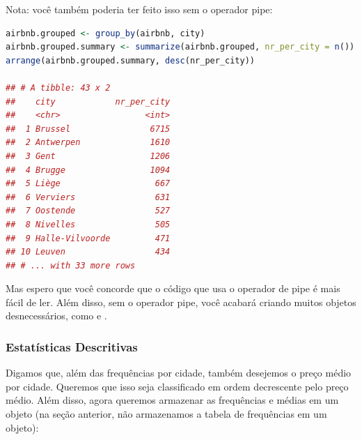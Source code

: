 \documentclass{article}
\begin{document}
Nota: você também poderia ter feito isso sem o operador pipe:

\begin{lstlisting}[language=R]
airbnb.grouped <- group_by(airbnb, city)
airbnb.grouped.summary <- summarize(airbnb.grouped, nr_per_city = n())
arrange(airbnb.grouped.summary, desc(nr_per_city))

## # A tibble: 43 x 2
##    city            nr_per_city
##    <chr>                 <int>
##  1 Brussel                6715
##  2 Antwerpen              1610
##  3 Gent                   1206
##  4 Brugge                 1094
##  5 Liège                   667
##  6 Verviers                631
##  7 Oostende                527
##  8 Nivelles                505
##  9 Halle-Vilvoorde         471
## 10 Leuven                  434
## # ... with 33 more rows
\end{lstlisting}

Mas espero que você concorde que o código que usa o operador de pipe é mais fácil de ler. Além disso, sem o operador pipe, você acabará criando muitos objetos desnecessários, como  e .



\subsubsection{Estatísticas Descritivas}

Digamos que, além das frequências por cidade, também desejemos o preço médio por cidade. Queremos que isso seja classificado em ordem decrescente pelo preço médio. Além disso, agora queremos armazenar as frequências e médias em um objeto (na seção anterior, não armazenamos a tabela de frequências em um objeto):
\end{document}
